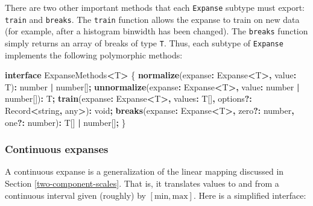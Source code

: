 \documentclass[
]{book}
\newenvironment{Shaded}{\begin{snugshade}}{\end{snugshade}}
\newcommand{\BuiltInTok}[1]{#1}
\newcommand{\DataTypeTok}[1]{\textcolor[rgb]{0.13,0.29,0.53}{#1}}
\newcommand{\FunctionTok}[1]{\textcolor[rgb]{0.13,0.29,0.53}{\textbf{#1}}}
\newcommand{\KeywordTok}[1]{\textcolor[rgb]{0.13,0.29,0.53}{\textbf{#1}}}
\newcommand{\NormalTok}[1]{#1}
\newcommand{\OperatorTok}[1]{\textcolor[rgb]{0.81,0.36,0.00}{\textbf{#1}}}
\theoremstyle{definition}
\theoremstyle{definition}
\theoremstyle{definition}
\theoremstyle{definition}
\theoremstyle{remark}
\begin{document}
There are two other important methods that each \texttt{Expanse} subtype must export: \texttt{train} and \texttt{breaks}. The \texttt{train} function allows the expanse to train on new data (for example, after a histogram binwidth has been changed). The \texttt{breaks} function simply returns an array of breaks of type \texttt{T}. Thus, each subtype of \texttt{Expanse} implements the following polymorphic methods:

\begin{Shaded}
\begin{Highlighting}[]
\KeywordTok{interface}\NormalTok{ ExpanseMethods}\OperatorTok{\textless{}}\NormalTok{T}\OperatorTok{\textgreater{}}\NormalTok{ \{}
  \FunctionTok{normalize}\NormalTok{(expanse}\OperatorTok{:}\NormalTok{ Expanse}\OperatorTok{\textless{}}\NormalTok{T}\OperatorTok{\textgreater{},}\NormalTok{ value}\OperatorTok{:}\NormalTok{ T)}\OperatorTok{:} \DataTypeTok{number} \OperatorTok{|} \DataTypeTok{number}\NormalTok{[]}\OperatorTok{;}
  \FunctionTok{unnormalize}\NormalTok{(expanse}\OperatorTok{:}\NormalTok{ Expanse}\OperatorTok{\textless{}}\NormalTok{T}\OperatorTok{\textgreater{},}\NormalTok{ value}\OperatorTok{:} \DataTypeTok{number} \OperatorTok{|} \DataTypeTok{number}\NormalTok{[])}\OperatorTok{:}\NormalTok{ T}\OperatorTok{;}
  \FunctionTok{train}\NormalTok{(expanse}\OperatorTok{:}\NormalTok{ Expanse}\OperatorTok{\textless{}}\NormalTok{T}\OperatorTok{\textgreater{},}\NormalTok{ values}\OperatorTok{:}\NormalTok{ T[]}\OperatorTok{,}\NormalTok{ options}\OperatorTok{?:} \BuiltInTok{Record}\OperatorTok{\textless{}}\DataTypeTok{string}\OperatorTok{,} \DataTypeTok{any}\OperatorTok{\textgreater{}}\NormalTok{)}\OperatorTok{:} \DataTypeTok{void}\OperatorTok{;}
  \FunctionTok{breaks}\NormalTok{(expanse}\OperatorTok{:}\NormalTok{ Expanse}\OperatorTok{\textless{}}\NormalTok{T}\OperatorTok{\textgreater{},}\NormalTok{ zero}\OperatorTok{?:} \DataTypeTok{number}\OperatorTok{,}\NormalTok{ one}\OperatorTok{?:} \DataTypeTok{number}\NormalTok{)}\OperatorTok{:}\NormalTok{ T[] }\OperatorTok{|} \DataTypeTok{number}\NormalTok{[]}\OperatorTok{;}
\NormalTok{\}}
\end{Highlighting}
\end{Shaded}

\subsubsection{Continuous expanses}\label{continuous-expanses}

A continuous expanse is a generalization of the linear mapping discussed in Section \ref{two-component-scales}. That is, it translates values to and from a continuous interval given (roughly) by \([\text{min}, \text{max}]\). Here is a simplified interface:
\end{document}
